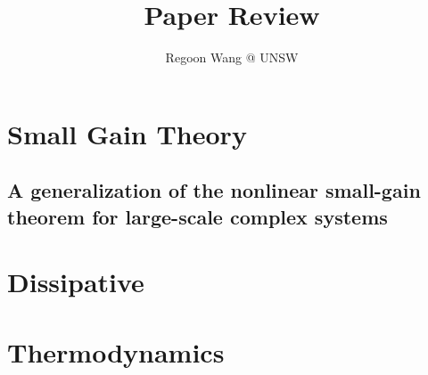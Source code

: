 \documentclass[10pt,a4paper]{report}
\begin{document}
\newcommand{\file}[1]{\textbf{title:} #1 \\}
\title{Paper Review}
\author{Regoon Wang @ UNSW}
\maketitle

\tableofcontents
\chapter{Small Gain Theory}
\section{A generalization of the nonlinear small-gain theorem for large-scale complex systems}
\cite{Jiang2008}


\chapter{Dissipative}
\chapter{Thermodynamics}
\end{document}
